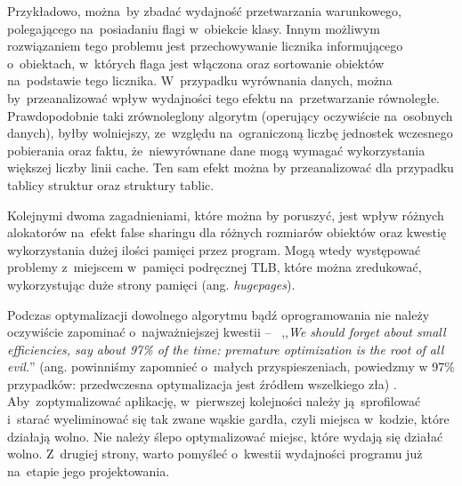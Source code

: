 Przykładowo, można~by zbadać wydajność przetwarzania warunkowego, polegającego na~posiadaniu flagi w~obiekcie klasy. Innym możliwym rozwiązaniem tego problemu jest przechowywanie licznika informującego o~obiektach, w~których flaga jest włączona oraz sortowanie obiektów na~podstawie tego licznika.
W~przypadku wyrównania danych, można by~przeanalizować wpływ wydajności tego efektu na~przetwarzanie równoległe. Prawdopodobnie taki zrównoleglony algorytm (operujący oczywiście na~osobnych danych), byłby wolniejszy, ze~względu na~ograniczoną liczbę jednostek wczesnego pobierania oraz faktu, że~niewyrównane dane mogą wymagać wykorzystania większej liczby linii cache.
Ten sam efekt można by przeanalizować dla przypadku tablicy struktur oraz struktury tablic.

Kolejnymi dwoma zagadnieniami, które można by poruszyć, jest wpływ różnych alokatorów na~efekt false sharingu dla różnych rozmiarów obiektów oraz kwestię wykorzystania dużej ilości pamięci przez program. Mogą wtedy występować problemy z~miejscem w~pamięci podręcznej TLB, które można zredukować, wykorzystując duże strony pamięci (ang. \textit{hugepages}).

Podczas optymalizacji dowolnego algorytmu bądź oprogramowania nie należy oczywiście zapominać o~najważniejszej kwestii --~ ,,\textit{We should forget about small efficiencies, say about 97\% of the time: premature optimization is the root of all evil.}'' (ang. powinniśmy zapomnieć o~małych przyspieszeniach, powiedzmy w 97\% przypadków: przedwczesna optymalizacja jest źródłem wszelkiego zła) \cite{Knuth}. Aby~zoptymalizować aplikację, w~pierwszej kolejności należy ją~sprofilować i~starać wyeliminować się tak zwane wąskie gardła, czyli miejsca w~kodzie, które działają wolno. Nie należy ślepo optymalizować miejsc, które wydają się działać wolno. Z~drugiej strony, warto pomyśleć o~kwestii wydajności programu już na~etapie jego projektowania.
